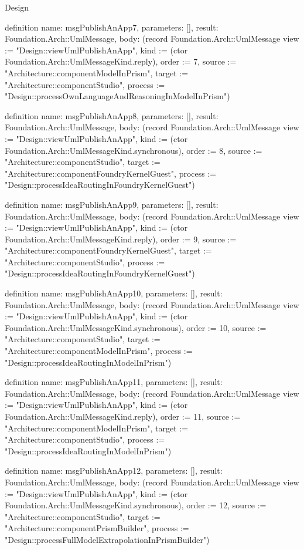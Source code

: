 \begin{lexlean}{Design}
\begin{semanticmodule}
definition{
  name: msgPublishAnApp7,
  parameters: [],
  result: Foundation.Arch::UmlMessage,
  body: (record Foundation.Arch::UmlMessage {view := "Design::viewUmlPublishAnApp", kind := (ctor Foundation.Arch::UmlMessageKind.reply), order := 7, source := "Architecture::componentModelInPrism", target := "Architecture::componentStudio", process := "Design::processOwnLanguageAndReasoningInModelInPrism"})
}

definition{
  name: msgPublishAnApp8,
  parameters: [],
  result: Foundation.Arch::UmlMessage,
  body: (record Foundation.Arch::UmlMessage {view := "Design::viewUmlPublishAnApp", kind := (ctor Foundation.Arch::UmlMessageKind.synchronous), order := 8, source := "Architecture::componentStudio", target := "Architecture::componentFoundryKernelGuest", process := "Design::processIdeaRoutingInFoundryKernelGuest"})
}

definition{
  name: msgPublishAnApp9,
  parameters: [],
  result: Foundation.Arch::UmlMessage,
  body: (record Foundation.Arch::UmlMessage {view := "Design::viewUmlPublishAnApp", kind := (ctor Foundation.Arch::UmlMessageKind.reply), order := 9, source := "Architecture::componentFoundryKernelGuest", target := "Architecture::componentStudio", process := "Design::processIdeaRoutingInFoundryKernelGuest"})
}

definition{
  name: msgPublishAnApp10,
  parameters: [],
  result: Foundation.Arch::UmlMessage,
  body: (record Foundation.Arch::UmlMessage {view := "Design::viewUmlPublishAnApp", kind := (ctor Foundation.Arch::UmlMessageKind.synchronous), order := 10, source := "Architecture::componentStudio", target := "Architecture::componentModelInPrism", process := "Design::processIdeaRoutingInModelInPrism"})
}

definition{
  name: msgPublishAnApp11,
  parameters: [],
  result: Foundation.Arch::UmlMessage,
  body: (record Foundation.Arch::UmlMessage {view := "Design::viewUmlPublishAnApp", kind := (ctor Foundation.Arch::UmlMessageKind.reply), order := 11, source := "Architecture::componentModelInPrism", target := "Architecture::componentStudio", process := "Design::processIdeaRoutingInModelInPrism"})
}

definition{
  name: msgPublishAnApp12,
  parameters: [],
  result: Foundation.Arch::UmlMessage,
  body: (record Foundation.Arch::UmlMessage {view := "Design::viewUmlPublishAnApp", kind := (ctor Foundation.Arch::UmlMessageKind.synchronous), order := 12, source := "Architecture::componentStudio", target := "Architecture::componentPrismBuilder", process := "Design::processFullModelExtrapolationInPrismBuilder"})
}


\end{semanticmodule}
\end{lexlean}
